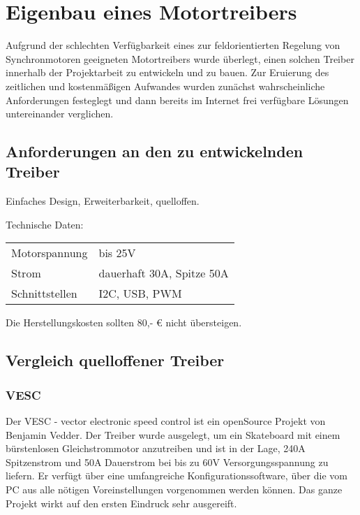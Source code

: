 \renewcommand{\autoren}{Stephan Morongowski}
\newpage
\section{Eigenbau eines Motortreibers}
Aufgrund der schlechten Verfügbarkeit eines zur feldorientierten Regelung von Synchronmotoren geeigneten Motortreibers wurde überlegt, einen solchen Treiber innerhalb der Projektarbeit zu entwickeln und zu bauen. Zur Eruierung des zeitlichen und kostenmäßigen Aufwandes wurden zunächst wahrscheinliche Anforderungen festeglegt und dann bereits im Internet frei verfügbare Lösungen untereinander verglichen.

\subsection{Anforderungen an den zu entwickelnden Treiber}
Einfaches Design, Erweiterbarkeit, quelloffen.
\par\bigskip

Technische Daten:
\par\bigskip
\begin{tabularx}{\textwidth} {@{\hspace{1cm}}lX@{}}
    Motorspannung & bis 25V \\
    Strom & dauerhaft 30A, Spitze 50A \\
    Schnittstellen & I2C, USB, PWM \\
\end{tabularx}

\par\bigskip
Die Herstellungskosten sollten 80,- € nicht übersteigen.

\subsection{Vergleich quelloffener Treiber}

\subsubsection{VESC}
Der VESC - vector electronic speed control \cite{vesc} ist ein openSource Projekt von Benjamin Vedder. Der Treiber wurde ausgelegt, um ein Skateboard mit einem bürstenlosen Gleichstrommotor anzutreiben und ist in der Lage, 240A Spitzenstrom und 50A Dauerstrom bei bis zu 60V Versorgungsspannung zu liefern. Er verfügt über eine umfangreiche Konfigurationssoftware, über die vom PC aus alle nötigen Voreinstellungen vorgenommen werden können. Das ganze Projekt wirkt auf den ersten Eindruck sehr ausgereift.
\par\bigskip

